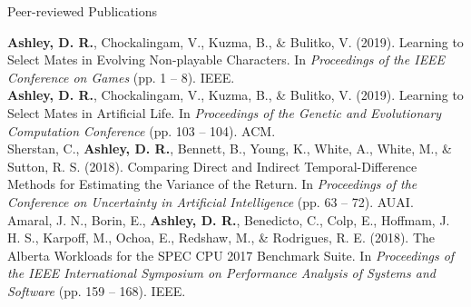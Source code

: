 \documentclass{cv}
\begin{document}
\begin{rSection}{Peer-reviewed Publications}

{\bf Ashley, D. R.}, Chockalingam, V., Kuzma, B., \& Bulitko, V. (2019). Learning to Select Mates in Evolving Non-playable Characters. In {\em Proceedings of the IEEE Conference on Games} (pp. 1 -- 8). IEEE. \vspace{0.5em}\\
{\bf Ashley, D. R.}, Chockalingam, V., Kuzma, B., \& Bulitko, V. (2019). Learning to Select Mates in Artificial Life. In {\em Proceedings of the Genetic and Evolutionary Computation Conference} (pp. 103 -- 104). ACM. \vspace{0.5em}\\
Sherstan, C., {\bf Ashley, D. R.}, Bennett, B., Young, K., White, A., White, M., \& Sutton, R. S. (2018). Comparing Direct and Indirect Temporal-Difference Methods for Estimating the Variance of the Return. In {\em Proceedings of the Conference on Uncertainty in Artificial Intelligence} (pp. 63 -- 72). AUAI. \vspace{0.5em}\\
Amaral, J. N., Borin, E., {\bf Ashley, D. R.}, Benedicto, C., Colp, E., Hoffmam, J. H. S., Karpoff, M., Ochoa, E., Redshaw, M., \& Rodrigues, R. E. (2018). The Alberta Workloads for the SPEC CPU 2017 Benchmark Suite. In {\em Proceedings of the IEEE International Symposium on Performance Analysis of Systems and Software} (pp. 159 -- 168). IEEE.

\end{rSection}

\end{document}
